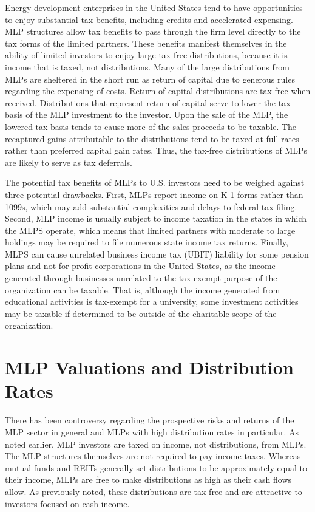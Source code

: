 \documentclass[11pt]{article}
\begin{document}
Energy development enterprises in the United States tend to have opportunities to enjoy substantial tax benefits, including credits and accelerated expensing. MLP structures allow tax benefits to pass through the firm level directly to the tax forms of the limited partners. These benefits manifest themselves in the ability of limited investors to enjoy large tax-free distributions, because it is income that is taxed, not distributions. Many of the large distributions from MLPs are sheltered in the short run as return of capital due to generous rules regarding the expensing of costs. Return of capital distributions are tax-free when received. Distributions that represent return of capital serve to lower the tax basis of the MLP investment to the investor. Upon the sale of the MLP, the lowered tax basis tends to cause more of the sales proceeds to be taxable. The recaptured gains attributable to the distributions tend to be taxed at full rates rather than preferred capital gain rates. Thus, the tax-free distributions of MLPs are likely to serve as tax deferrals.

The potential tax benefits of MLPs to U.S. investors need to be weighed against three potential drawbacks. First, MLPs report income on K-1 forms rather than 1099s, which may add substantial complexities and delays to federal tax filing. Second, MLP income is usually subject to income taxation in the states in which the MLPS operate, which means that limited partners with moderate to large holdings may be required to file numerous state income tax returns. Finally, MLPS can cause unrelated business income tax (UBIT) liability for some pension plans and not-for-profit corporations in the United States, as the income generated through businesses unrelated to the tax-exempt purpose of the organization can be taxable. That is, although the income generated from educational activities is tax-exempt for a university, some investment activities may be taxable if determined to be outside of the charitable scope of the organization.

\section*{MLP Valuations and Distribution Rates}
There has been controversy regarding the prospective risks and returns of the MLP sector in general and MLPs with high distribution rates in particular. As noted earlier, MLP investors are taxed on income, not distributions, from MLPs. The MLP structures themselves are not required to pay income taxes. Whereas mutual funds and REITs generally set distributions to be approximately equal to their income, MLPs are free to make distributions as high as their cash flows allow. As previously noted, these distributions are tax-free and are attractive to investors focused on cash income.
\end{document}
